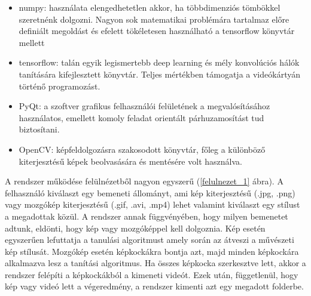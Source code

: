 \documentclass[12pt, a4paper, oneside]{book}
\theoremstyle{tetel}
\begin{document}
\begin{itemize}
	\item numpy\cite{24}: használata elengedhetetlen akkor, ha többdimenziós tömbökkel szeretnénk dolgozni. Nagyon sok matematikai problémára tartalmaz előre definiált megoldást és efelett tökéletesen használható a tensorflow könyvtár mellett
	\item tensorflow\cite{7}: talán egyik legismertebb deep learning és mély konvolúciós hálók tanítására kifejlesztett könyvtár. Teljes mértékben támogatja a videókártyán történő programozást.
	\item PyQt\cite{25}: a szoftver grafikus felhasználói felületének a megvalósításához használatos, emellett komoly feladat orientált párhuzamosítást tud biztosítani.
	\item OpenCV\cite{26}: képfeldolgozásra szakosodott könyvtár, főleg a különböző kiterjesztésű képek beolvasására és mentésére volt használva.
\end{itemize}

A rendszer működése felülnézetből nagyon egyszerű (\ref{felulnezet_1} ábra). A felhasználó kiválaszt egy bemeneti állományt, ami kép kiterjesztésű (.jpg, .png) vagy mozgókép kiterjesztésű (.gif, .avi, .mp4) lehet valamint kiválaszt egy stílust a megadottak közül. A rendszer annak függvényében, hogy milyen bemenetet adtunk, eldönti, hogy kép vagy mozgóképpel kell dolgoznia. Kép esetén egyszerűen lefuttatja a tanulási algoritmust amely során az átveszi a művészeti kép stílusát. Mozgókép esetén képkockákra bontja azt, majd minden képkockára alkalmazva lesz a tanítási algoritmus. Ha összes képkocka szerkesztve lett, akkor a rendszer felépíti a képkockákból a kimeneti videót. Ezek után, függetlenül, hogy kép vagy videó lett a végeredmény, a rendszer kimenti azt egy megadott folderbe.
\end{document}
